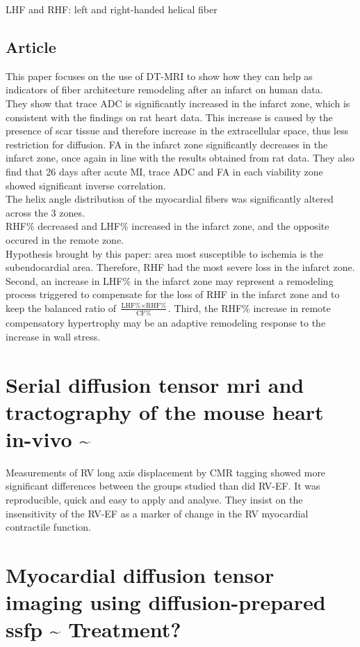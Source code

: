 LHF and RHF: left and right-handed helical fiber

\subsection{Article}

This paper focuses on the use of DT-MRI to show how they can help as indicators of fiber architecture remodeling after an infarct on human data.\\
They show that trace ADC is significantly increased in the infarct zone, which is consistent with the findings on rat heart data. This increase is caused by the presence of scar tissue and therefore increase in the extracellular space, thus less restriction for diffusion.
FA in the infarct zone significantly decreases in the infarct zone, once again in line with the results obtained from rat data. They also find that 26 days after acute MI, trace ADC and FA in each viability zone showed significant inverse correlation.\\
The helix angle distribution of the myocardial fibers was significantly altered across the 3 zones.\\
RHF\% decreased and LHF\% increased in the infarct zone, and the opposite occured in the remote zone.\\
Hypothesis brought by this paper: area most susceptible to ischemia is the subendocardial area. Therefore, RHF had the most severe loss in the infarct zone. Second, an increase in LHF\% in the infarct zone may represent a remodeling process triggered to compensate for the loss of RHF in the infarct zone and to keep the balanced ratio of $\frac{\text{LHF\%} \times \text{RHF\%}}{\text{CF\%}}$. Third, the RHF\% increase in remote compensatory hypertrophy may be an adaptive remodeling response to the increase in wall stress.

\section{Serial diffusion tensor mri and tractography of the mouse heart in-vivo \~{}}

Measurements of RV long axis displacement by CMR tagging showed more significant differences between the groups studied than did RV-EF. It was reproducible, quick and easy to apply and analyse. They insist on the insensitivity of the RV-EF as a marker of change in the RV myocardial contractile function.

\section{Myocardial diffusion tensor imaging using diffusion-prepared ssfp \~{} Treatment?}

